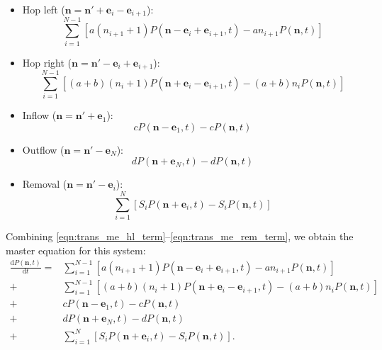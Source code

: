 \documentclass[a4paper,11pt]{article}
\numberwithin{equation}{section}
\newcommand{\diff}[2]{\frac{\mathrm{d} #1}{\mathrm{d} #2}}
\newcommand{\V}[1]{\mathbf{#1}}
\begin{document}
\begin{itemize}
    \item Hop left (\(\V{n} = \V{n}' + \V{e}_i - \V{e}_{i+1}\)):
        \begin{equation}
            \label{eqn:trans_me_hl_term}
            \sum_{i=1}^{N-1} \left[a(n_{i+1}+1) P(\V{n} - \V{e}_i +
                \V{e}_{i+1},t) - a n_{i+1} P(\V{n},t) \right]
        \end{equation}
    \item Hop right (\(\V{n} = \V{n}' - \V{e}_i + \V{e}_{i+1}\)):
        \begin{equation}
            \label{eqn:trans_me_hr_term}
            \sum_{i=1}^{N-1} \left[(a+b)(n_i+1) P(\V{n} + \V{e}_i -
                \V{e}_{i+1},t) - (a+b)n_i P(\V{n},t) \right]
        \end{equation}
    \item Inflow (\(\V{n} = \V{n}' + \V{e}_1\)):
        \begin{equation}
            \label{eqn:trans_me_in_term}
            cP(\V{n} - \V{e}_1,t) - c P(\V{n},t)
        \end{equation}
    \item Outflow (\(\V{n} = \V{n}' - \V{e}_N\)):
        \begin{equation}
            \label{eqn:trans_me_out_term}
            dP(\V{n} + \V{e}_N,t) - d P(\V{n},t)
        \end{equation}
    \item Removal (\(\V{n} = \V{n}' - \V{e}_i\)):
        \begin{equation}
            \label{eqn:trans_me_rem_term}
            \sum_{i=1}^N \left[ S_i P(\V{n} + \V{e}_i,t) - S_i P(\V{n},t)
                \right]
        \end{equation}
\end{itemize}

Combining \eqref{eqn:trans_me_hl_term}--\eqref{eqn:trans_me_rem_term}, we
obtain the master equation for this system:
\begin{equation}
    \label{eqn:trans_me}
    \begin{split}
        \diff{P(\V{n},t)}{t} = &
            \sum_{i=1}^{N-1} \left[a(n_{i+1}+1) P(\V{n} - \V{e}_i +
                \V{e}_{i+1},t) - a n_{i+1} P(\V{n},t) \right]\\
            +&\sum_{i=1}^{N-1} \left[(a+b)(n_i+1) P(\V{n} + \V{e}_i -
                \V{e}_{i+1},t) - (a+b)n_i P(\V{n},t) \right]\\
            +&cP(\V{n} - \V{e}_1,t) - c P(\V{n},t)\\
            +&dP(\V{n} + \V{e}_N,t) - d P(\V{n},t)\\
            +&\sum_{i=1}^N \left[ S_i P(\V{n} + \V{e}_i,t) - S_i P(\V{n},t)
                \right].
    \end{split}
\end{equation}
\end{document}
